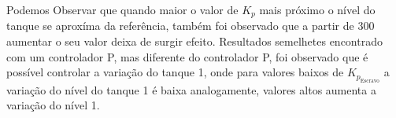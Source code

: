 Podemos Observar que quando maior o valor de $K_p$ mais próximo o nível do tanque se aproxíma da referência, também foi observado que a partir de 300
aumentar o seu valor deixa de surgir efeito. Resultados semelhetes encontrado com um controlador P, mas  diferente do controlador P, foi observado que é possível
controlar a variação do tanque 1, onde para valores baixos de  $K_{p_{\textrm{Escravo}}}$ a variação do nível do tanque 1 é baixa analogamente, valores altos aumenta a variação
do nível 1.